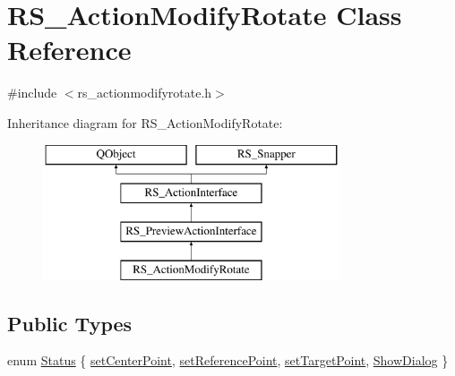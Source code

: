 \hypertarget{classRS__ActionModifyRotate}{\section{R\-S\-\_\-\-Action\-Modify\-Rotate Class Reference}
\label{classRS__ActionModifyRotate}
}


{\ttfamily \#include $<$rs\-\_\-actionmodifyrotate.\-h$>$}

Inheritance diagram for R\-S\-\_\-\-Action\-Modify\-Rotate\-:\begin{figure}[H]
\begin{center}
\leavevmode
\includegraphics[height=4.000000cm]{classRS__ActionModifyRotate}
\end{center}
\end{figure}
\subsection*{Public Types}
\begin{DoxyCompactItemize}
\item 
enum \hyperlink{classRS__ActionModifyRotate_a4797d447eb4697d4e5bec7946a650b44}{Status} \{ \hyperlink{classRS__ActionModifyRotate_a4797d447eb4697d4e5bec7946a650b44a6bf69d8fca5d833663af5be069293bcf}{set\-Center\-Point}, 
\hyperlink{classRS__ActionModifyRotate_a4797d447eb4697d4e5bec7946a650b44a4338b07601749509e681711ee21e692f}{set\-Reference\-Point}, 
\hyperlink{classRS__ActionModifyRotate_a4797d447eb4697d4e5bec7946a650b44a8c5ce5fa02e1d8dc9dc662ca5d30a1c5}{set\-Target\-Point}, 
\hyperlink{classRS__ActionModifyRotate_a4797d447eb4697d4e5bec7946a650b44a4e6654ff378c1cf0cabb274faedb2f08}{Show\-Dialog}
 \}
\end{DoxyCompactItemize}
